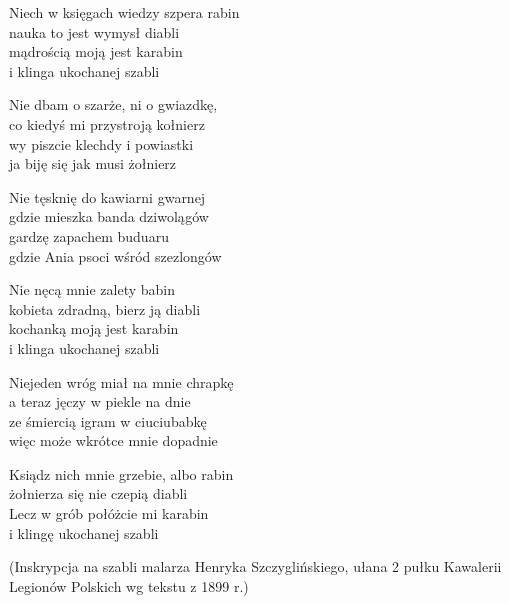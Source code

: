 \begin{text}
    Niech w księgach wiedzy szpera rabin\\
    nauka to jest wymysł diabli\\
    mądrością moją jest karabin\\
    i klinga ukochanej szabli

    Nie dbam o szarże, ni o gwiazdkę,\\
    co kiedyś mi przystroją kołnierz\\
    wy piszcie klechdy i powiastki\\
    ja biję się jak musi żołnierz

    Nie tęsknię do kawiarni gwarnej\\
    gdzie mieszka banda dziwolągów\\
    gardzę zapachem buduaru\\
    gdzie Ania psoci wśród szezlongów

    Nie nęcą mnie zalety babin\\
    kobieta zdradną, bierz ją diabli\\
    kochanką moją jest karabin\\
    i klinga ukochanej szabli

    Niejeden wróg miał na mnie chrapkę\\
    a teraz jęczy w piekle na dnie\\
    ze śmiercią igram w ciuciubabkę\\
    więc może wkrótce mnie dopadnie

    Ksiądz nich mnie grzebie, albo rabin\\
    żołnierza się nie czepią diabli\\
    Lecz w grób połóżcie mi karabin\\
    i klingę ukochanej szabli

    (Inskrypcja na szabli malarza Henryka Szczyglińskiego, ułana 2 pułku Kawalerii Legionów Polskich wg tekstu  z 1899 r.)

\end{text}

